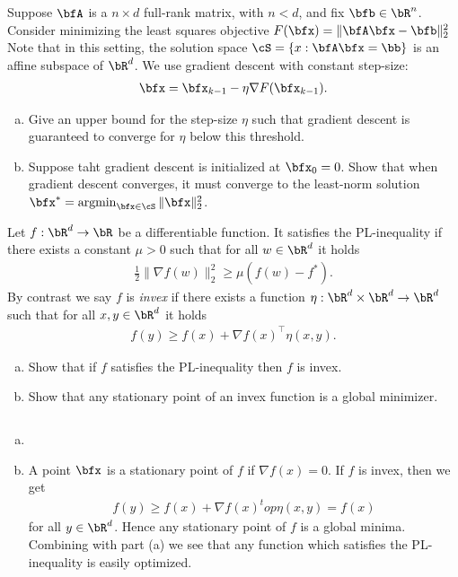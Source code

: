 \begin{homework}[e]
  \prob Suppose $\bfA$ is a $n\times d$ full-rank matrix, with $n < d$, and fix $\bfb\in \bR^n$. Consider minimizing the least squares objective $F(\bfx) = \|\bfA\bfx - \bfb\|^2_2$ Note that in this setting, the solution space $\cS = \{x : \bfA\bfx = \bb\}$ is an affine subspace of $\bR^d$. We use gradient descent with constant step-size:
  \begin{align*}
    \bfx = \bfx_{k-1} - \eta \nabla F(\bfx_{k-1}).
  \end{align*}
  \begin{enumerate}[(a)]
    \item Give an upper bound for the step-size $\eta$ such that gradient descent is guaranteed to converge for $\eta$ below this threshold.
    \item Suppose taht gradient descent is initialized at $\bfx_0 = 0$. Show that when gradient descent converges, it must converge to the least-norm solution $\bfx^* = \operatorname{argmin}_{\bfx \in \cS} \|\bfx\|^2_2$.
  \end{enumerate}

  \prob Let $f:\bR^d \to \bR$ be a differentiable function. It satisfies the PL-inequality if there exists a constant $\mu > 0$ such that for all $w \in \bR^d$ it holds
  \begin{align*}
    \frac{1}{2}\|\nabla f(w)\|^2_2 \geq \mu(f(w) - f^*).
  \end{align*}
  By contrast we say $f$ is \emph{invex} if there exists a function $\eta:\bR^d\times \bR^d\to \bR^d$ such that for all $x, y\in \bR^d$ it holds
  \begin{align*}
    f(y) \geq f(x) + \nabla f(x)^\top \eta(x,y).
  \end{align*}
  \begin{enumerate}[(a)]
    \item Show that if $f$ satisfies the PL-inequality then $f$ is invex.
    \item Show that any stationary point of an invex function is a global minimizer.
  \end{enumerate}
  \begin{prf}$ $
    \begin{enumerate}[(a)]
      \item 
      \item A point $\bfx$ is a stationary point of $f$ if $\nabla f(x) = 0$. If $f$ is invex, then we get
        \begin{align*}
          f(y) \geq f(x) + \nabla f(x)^top \eta(x,y) = f(x)
        \end{align*}
        for all $y\in \bR^d$. Hence any stationary point of $f$ is a global minima. Combining with part (a) we see that any function which satisfies the PL-inequality is easily optimized.
    \end{enumerate}
  \end{prf}
\end{homework}
\newpage
\begin{verbatim}  
\end{verbatim}

